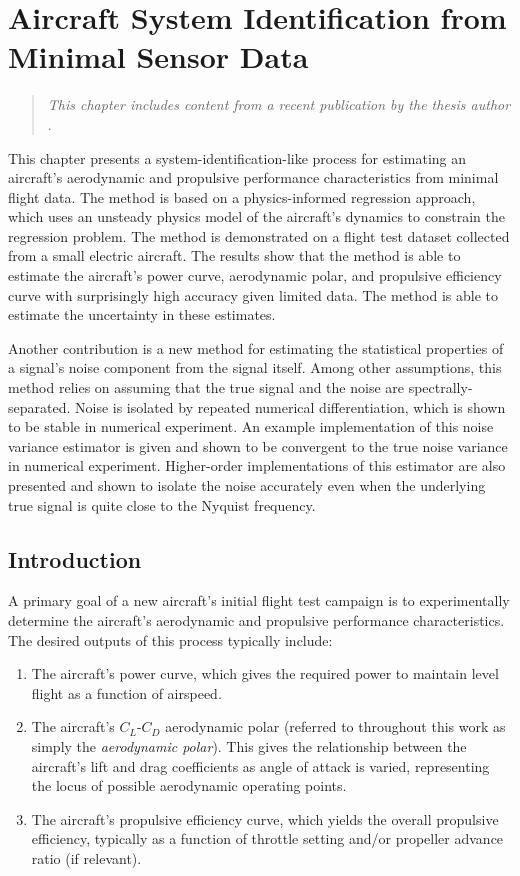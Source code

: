 \chapter{Aircraft System Identification from Minimal Sensor Data}
\label{chap:aircraft_sysid}

\begin{quote}
    \emph{This chapter includes content from a recent publication by the thesis author} \cite{sharpe_physicsinformed_2024}.
\end{quote}

This chapter presents a system-identification-like process for estimating an aircraft's aerodynamic and propulsive performance characteristics from minimal flight data. The method is based on a physics-informed regression approach, which uses an unsteady physics model of the aircraft's dynamics to constrain the regression problem. The method is demonstrated on a flight test dataset collected from a small electric aircraft. The results show that the method is able to estimate the aircraft's power curve, aerodynamic polar, and propulsive efficiency curve with surprisingly high accuracy given limited data. The method is able to estimate the uncertainty in these estimates.

Another contribution is a new method for estimating the statistical properties of a signal's noise component from the signal itself. Among other assumptions, this method relies on assuming that the true signal and the noise are spectrally-separated. Noise is isolated by repeated numerical differentiation, which is shown to be stable in numerical experiment. An example implementation of this noise variance estimator is given and shown to be convergent to the true noise variance in numerical experiment. Higher-order implementations of this estimator are also presented and shown to isolate the noise accurately even when the underlying true signal is quite close to the Nyquist frequency.


\section{Introduction}

A primary goal of a new aircraft's initial flight test campaign is to experimentally determine the aircraft's aerodynamic and propulsive performance characteristics. The desired outputs of this process typically include:

\begin{enumerate}
    \item The aircraft's power curve, which gives the required power to maintain level flight as a function of airspeed.
    \item The aircraft's $C_L$-$C_D$ aerodynamic polar (referred to throughout this work as simply the \textit{aerodynamic polar}). This gives the relationship between the aircraft's lift and drag coefficients as angle of attack is varied, representing the locus of possible aerodynamic operating points.
    \item The aircraft's propulsive efficiency curve, which yields the overall propulsive efficiency, typically as a function of throttle setting and/or propeller advance ratio (if relevant).
\end{enumerate}

